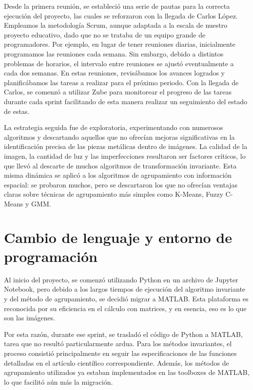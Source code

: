Desde la primera reunión, se estableció una serie de pautas para la correcta ejecución del proyecto, las cuales se reforzaron con la llegada de Carlos López. Empleamos la metodología Scrum, aunque adaptada a la escala de nuestro proyecto educativo, dado que no se trataba de un equipo grande de programadores. Por ejemplo, en lugar de tener reuniones diarias, inicialmente programamos las reuniones cada semana. Sin embargo, debido a distintos problemas de horarios, el intervalo entre reuniones se ajustó eventualmente a cada dos semanas. En estas reuniones, revisábamos los avances logrados y planificábamos las tareas a realizar para el próximo periodo. Con la llegada de Carlos, se comenzó a utilizar Zube para monitorear el progreso de las tareas durante cada sprint facilitando de esta manera realizar un seguimiento del estado de estas.

La estrategia seguida fue de exploratoria, experimentando con numerosos algoritmos y descartando aquellos que no ofrecían mejoras significativas en la identificación precisa de las piezas metálicas dentro de imágenes. La calidad de la imagen, la cantidad de luz y las imperfecciones resultaron ser factores críticos, lo que llevó al descarte de muchos algoritmos de transformación invariante. Esta misma dinámica se aplicó a los algoritmos de agrupamiento con información espacial: se probaron muchos, pero se descartaron los que no ofrecían ventajas claras sobre técnicas de agrupamiento más simples como K-Means, Fuzzy C-Means y GMM.

\section{Cambio de lenguaje y entorno de programación}\label{cambio-de-lenguaje-y-entorno-de-programación}

Al inicio del proyecto, se comenzó utilizando Python en un archivo de Jupyter Notebook, pero debido a los largos tiempos de ejecución del algoritmo invariante y del método de agrupamiento, se decidió migrar a MATLAB. Esta plataforma es reconocida por su eficiencia en el cálculo con matrices, y en esencia, eso es lo que son las imágenes.

Por esta razón, durante ese sprint, se trasladó el código de Python a MATLAB, tarea que no resultó particularmente ardua. Para los métodos invariantes, el proceso consistió principalmente en seguir las especificaciones de las funciones detalladas en el artículo científico correspondiente. Además, los métodos de agrupamiento utilizados ya estaban implementados en las toolboxes de MATLAB, lo que facilitó aún más la migración.

